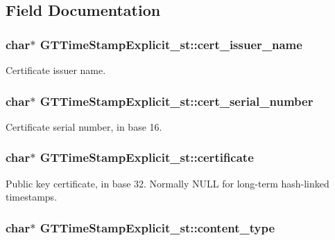 \subsection{Field Documentation}
\hypertarget{struct_g_t_time_stamp_explicit__st_a6158598fa0be81537cf54a94c1b20723}{
\subsubsection[{cert\_\-issuer\_\-name}]{\setlength{\rightskip}{0pt plus 5cm}char$\ast$ {\bf GTTimeStampExplicit\_\-st::cert\_\-issuer\_\-name}}}
\label{struct_g_t_time_stamp_explicit__st_a6158598fa0be81537cf54a94c1b20723}
Certificate issuer name. \hypertarget{struct_g_t_time_stamp_explicit__st_a383a82a36c0ae2b9978a70563cf1d037}{
\subsubsection[{cert\_\-serial\_\-number}]{\setlength{\rightskip}{0pt plus 5cm}char$\ast$ {\bf GTTimeStampExplicit\_\-st::cert\_\-serial\_\-number}}}
\label{struct_g_t_time_stamp_explicit__st_a383a82a36c0ae2b9978a70563cf1d037}
Certificate serial number, in base 16. \hypertarget{struct_g_t_time_stamp_explicit__st_a92d1a99352583d50e5866c8c69e29722}{
\subsubsection[{certificate}]{\setlength{\rightskip}{0pt plus 5cm}char$\ast$ {\bf GTTimeStampExplicit\_\-st::certificate}}}
\label{struct_g_t_time_stamp_explicit__st_a92d1a99352583d50e5866c8c69e29722}
Public key certificate, in base 32. Normally {\ttfamily NULL} for long-\/term hash-\/linked timestamps. \hypertarget{struct_g_t_time_stamp_explicit__st_aa7221ac65d21a1dd1748eac4707113e7}{
\subsubsection[{content\_\-type}]{\setlength{\rightskip}{0pt plus 5cm}char$\ast$ {\bf GTTimeStampExplicit\_\-st::content\_\-type}}}
